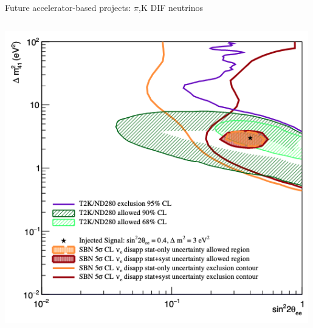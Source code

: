 \begin{frame}[t]{Future accelerator-based projects: $\pi$,K DIF neutrinos}
\begin{columns}[T]
\begin{column}{0.50\textwidth}
\begin{center}
        \includegraphics[width=0.99\textwidth]{./images/beyond3nu/sbn_c}
      \end{center}
    \end{column}
  \end{columns}

\end{frame}


%
%
%

%
%
